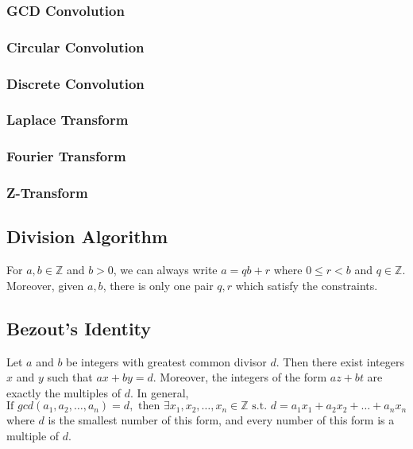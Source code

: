 \documentclass[12pt]{extarticle}
\begin{document}
\subsubsection*{GCD Convolution}
\subsubsection*{Circular Convolution}
\subsubsection*{Discrete Convolution}
\subsubsection*{Laplace Transform}
\subsubsection*{Fourier Transform}
\subsubsection*{Z-Transform}


\subsection*{Division Algorithm}
For $a,b\in\mathbb{Z}$ and $b>0$, we can always write $a=qb+r$ where $0\leq r<b$ and $q\in\mathbb{Z}$. Moreover, given $a,b$, there is only one pair $q,r$ which satisfy the constraints.
\subsection*{Bezout's Identity}
Let $a$ and $b$ be integers with greatest common divisor $d$. Then there exist integers $x$ and $y$ such that $ax + by = d$. Moreover, the integers of the form $az + bt$ are exactly the multiples of $d$. In general,
$$\text{If }gcd(a_{1},a_{2},\dots,a_{n})=d, \text{ then }\exists x_{1},x_{2},\dots,x_{n} \in\mathbb{Z} \text{ s.t. } d=a_{1}x_{1}+a_{2}x_{2}+\dots+a_{n}x_{n}$$ where $d$ is the smallest number of this form, and every number of this form is a multiple of $d$.
\end{document}
